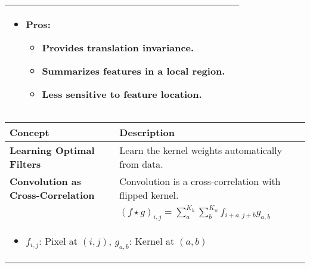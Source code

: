 \begin{summary}
\begin{center}
\begin{tabular}{ll}
{\begin{itemize}
                    \item \textbf{Pros:}
                    \begin{itemize}
                        \item Provides translation invariance.
                        \item Summarizes features in a local region.
                        \item Less sensitive to feature location. 
                    \end{itemize}
                \end{itemize}} \\
            \bottomrule
        \end{tabular}
    \end{center}
\end{summary}
\newpage

\begin{summary}
    \begin{center}
        \begin{tabular}{ll}
            \toprule
            \textbf{Concept} & \textbf{Description} \\
            \toprule
            \textbf{Learning Optimal Filters} & Learn the kernel weights automatically from data. \\
            \toprule
            \textbf{Convolution as Cross-Correlation} & Convolution is a cross-correlation with flipped kernel. \\
            & $(f \star g)_{i,j} = \sum_a^{K_h} \sum_b^{K_w} f_{i+a,j+b} g_{a,b}$ \\
            \multicolumn{2}{p{\linewidth}}{
                \begin{itemize}
                    \item $f_{i,j}$: Pixel at $(i,j)$, $g_{a,b}$: Kernel at $(a,b)$
                \end{itemize}} \\
            \bottomrule
        \end{tabular}
    \end{center}
\end{summary}

